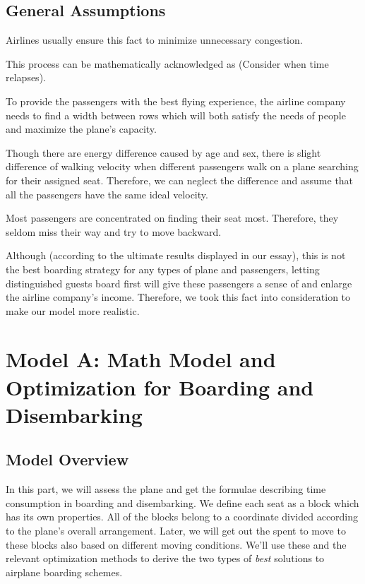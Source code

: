 \documentclass{article}
\theoremstyle{definition}
\theoremstyle{remark}
\numberwithin{equation}{section}
\begin{document}
	\subsection{General Assumptions}
	\begin{enumerate}

		Airlines usually ensure this fact to minimize unnecessary congestion.

		This process can be mathematically acknowledged as  (Consider when time relapses).

		To provide the passengers with the best flying experience, the airline company needs to find a width between rows which will both satisfy the needs of people and maximize the plane's capacity.

		Though there are energy difference caused by age and sex, there is slight difference of walking velocity when different passengers walk on a plane searching for their assigned seat. Therefore, we can neglect the difference and assume that all the passengers have the same ideal velocity.

		Most passengers are concentrated on finding their seat most. Therefore, they seldom miss their way and try to move backward.

		Although (according to the ultimate results displayed in our essay), this is not the best boarding strategy for any types of plane and passengers, letting distinguished guests board first will give these passengers a sense of  and enlarge the airline company's income. Therefore, we took this fact into consideration to make our model more realistic.
	\end{enumerate}
	\section{Model A: Math Model and Optimization for Boarding and Disembarking}
	\subsection{Model Overview}
	In this part, we will assess the plane and get the formulae describing time consumption in boarding and disembarking. We define each seat as a block which has its own properties. All of the blocks belong to a coordinate divided according to the plane's overall arrangement. Later, we will get out the spent to move to these blocks also based on different moving conditions. We'll use these and the relevant optimization methods to derive the two types of \textit{best} solutions to airplane boarding schemes.
\end{document}
